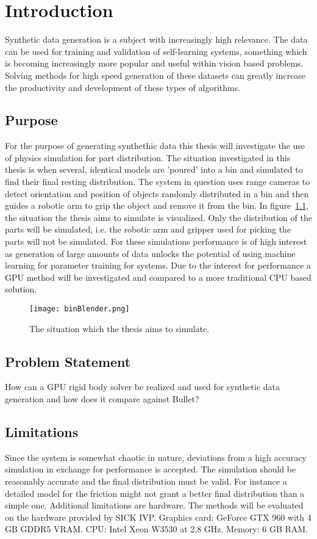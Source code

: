 \chapter{Introduction}\label{cha:intro}

Synthetic data generation is a subject with increasingly high relevance.
The data can be used for training and validation of self-learning systems,
something which is becoming increasingly more popular and useful within vision
based problems. Solving methods for high speed generation of these datasets
can greatly increase the productivity and development of these
types of algorithms.

\section{Purpose}
For the purpose of generating synthethic data this thesis will investigate the use of physics
simulation for part distribution. The situation investigated in this thesis
is when several, identical models are 'poured' into a bin and simulated to find their
final resting distribution. The system in question uses range cameras to detect
orientation and position of objects randomly distributed in a bin and then guides
a robotic arm to grip the object and remove it from the bin.
In figure~\ref{fig:plb}, the situation
the thesis aims to simulate is visualized. Only the distribution of the parts
will be simulated, i.e. the robotic arm and gripper used for picking the parts will not be simulated.
 For these simulations
performance is of high interest as generation of large amounts of data unlocks the potential of using machine learning
for parameter training for systems. Due to the interest for performance a GPU method will
be investigated and compared to a more traditional CPU based solution.

\begin{figure}[ht]
  \centering
  \texttt{[image: binBlender.png]}
  \caption{The situation which the thesis aims to simulate.}
  \label{fig:plb}
\end{figure}

\section{Problem Statement}
How can a GPU rigid body solver be realized and used for synthetic data generation
 and how does it compare against Bullet?

\section{Limitations}
Since the system is somewhat chaotic in nature, deviations from a high accuracy
simulation in exchange for performance is accepted. The simulation should be reasonably
accurate
and the final distribution must be valid. For instance a detailed
model for the friction might not grant a better final distribution than a simple one.
Additional limitations are hardware. The methods will be evaluated on the hardware
provided by SICK IVP. Graphics card: GeForce GTX 960 with 4 GB GDDR5 VRAM.
CPU: Intel Xeon W3530 at 2.8 GHz.
Memory: 6 GB RAM.

